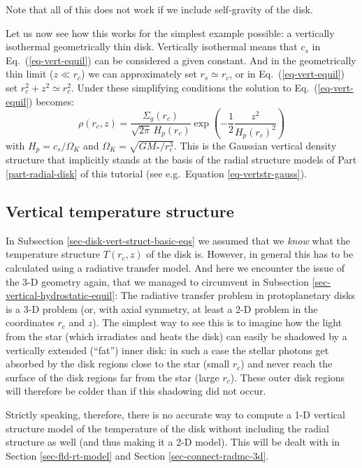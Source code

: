 \documentclass{book}
\begin{document}
Note that all of this does not work if we include self-gravity of the disk.

Let us now see how this works for the simplest example possible: a vertically
isothermal geometrically thin disk. Vertically isothermal means that
$c_s$ in Eq.~(\ref{eq-vert-equil}) can be considered a given constant. And
in the geometrically thin limit ($z\ll r_c$) we can approximately set
$r_s\simeq r_c$, or in Eq.~(\ref{eq-vert-equil}) set $r_c^2+z^2\simeq r_c^2$.
Under these simplifying conditions the solution to Eq.~(\ref{eq-vert-equil})
becomes:
\begin{equation}\label{eq-vertical-struct-gauss}
  \rho(r_c,z) = \frac{\Sigma_g(r_c)}{\sqrt{2\pi}\,H_p(r_c)}
  \exp\left(-\frac{1}{2}\frac{z^2}{H_p(r_c)^2}\right)
\end{equation}
with $H_p=c_s/\Omega_K$ and $\Omega_K=\sqrt{GM_{*}/r_c^3}$. This is the
Gaussian vertical density structure that implicitly stands at the basis
of the radial structure models of Part \ref{part-radial-disk} of this
tutorial (see e.g.~Equation \ref{eq-vertstr-gauss}).


\subsection{Vertical temperature structure}\label{sec-vertical-temperature-structure}
In Subsection \ref{sec-disk-vert-struct-basic-eqs} we assumed that we {\em know}
what the temperature structure $T(r_c,z)$ of the disk is. However, in general
this has to be calculated using a radiative transfer model.  And here we
encounter the issue of the 3-D geometry again, that we managed to circumvent in
Subsection \ref{sec-vertical-hydrostatic-equil}: The radiative transfer problem
in protoplanetary disks is a 3-D problem (or, with axial symmetry, at least a
2-D problem in the coordinates $r_c$ and $z$). The simplest way to see this is
to imagine how the light from the star (which irradiates and heats the disk) can
easily be shadowed by a vertically extended (``fat'') inner disk: in such a case
the stellar photons get absorbed by the disk regions close to the star (small
$r_c$) and never reach the surface of the disk regions far from the star (large
$r_c$). These outer disk regions will therefore be colder than if this shadowing
did not occur.

Strictly speaking, therefore, there is no accurate way to compute a 1-D vertical
structure model of the temperature of the disk without including the radial
structure as well (and thus making it a 2-D model). This will be dealt with
in Section \ref{sec-fld-rt-model} and Section \ref{sec-connect-radmc-3d}. 
\end{document}
